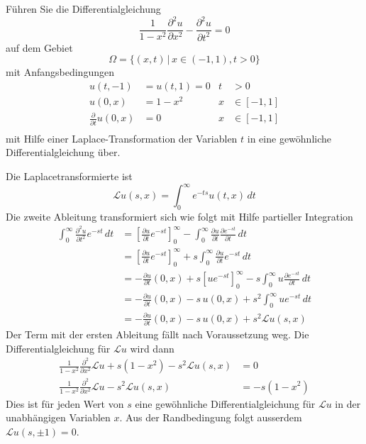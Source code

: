 Führen Sie die Differentialgleichung
\[
\frac1{1-x^2}\frac{\partial^2 u}{\partial x^2}
-
\frac{\partial^2 u}{\partial t^2}=0
\]
auf dem Gebiet
\[
\Omega=\{(x,t)\,|\, x\in (-1,1), t>0\}
\]
mit Anfangsbedingungen
\begin{align*}
u(t,-1)&=u(t,1)=0&t&>0\\
u(0,x)&=1-x^2&x&\in[-1,1]\\
\frac{\partial}{\partial t}u(0,x)&=0&x&\in[-1,1]\\
\end{align*}
mit Hilfe einer Laplace-Transformation der Variablen $t$ in eine
gewöhnliche Differentialgleichung über.

\begin{loesung}
Die Laplacetransformierte ist
\[
\mathscr{L}u(s,x)=\int_0^{\infty}e^{-ts}u(t,x)\,dt
\]
Die zweite Ableitung transformiert sich wie folgt mit Hilfe
partieller Integration
\begin{align*}
\int_0^\infty \frac{\partial^2u}{\partial t^2}e^{-st}\,dt
&=
\left[
\frac{\partial u}{\partial t}e^{-st}
\right]_0^\infty
-\int_0^\infty
\frac{\partial u}{\partial t}\frac{\partial e^{-st}}{\partial t}
\,dt
\\
&=
\left[
\frac{\partial u}{\partial t}e^{-st}
\right]_0^\infty
+s\int_0^\infty
\frac{\partial u}{\partial t}e^{-st}
\,dt
\\
&=
-\frac{\partial u}{\partial t}(0,x)
+s\left[
ue^{-st}
\right]_0^\infty
-s\int_0^\infty u\frac{\partial e^{-st}}{\partial t}\,dt
\\
&=
-\frac{\partial u}{\partial t}(0,x)
-s\,
u(0,x)
+s^2\int_0^\infty u e^{-st}\,dt
\\
&=
-\frac{\partial u}{\partial t}(0,x)
-s\,u(0,x)+s^2\mathscr{L}u(s,x)
\end{align*}
Der Term mit der ersten Ableitung fällt nach Voraussetzung weg.
Die Differentialgleichung für $\mathscr{L}u$ wird dann
\begin{align*}
\frac1{1-x^2}\frac{\partial^2}{\partial x^2}\mathscr{L}u
+s(1-x^2)-s^2\mathscr{L}u(s,x)
&=0
\\
\frac1{1-x^2}\frac{\partial^2}{\partial x^2}\mathscr{L}u
-s^2\mathscr{L}u(s,x)
&=-s(1-x^2)
\end{align*}
Dies ist für jeden Wert von $s$ eine gewöhnliche Differentialgleichung
für $\mathscr{L}u$ in der unabhängigen Variablen $x$.
Aus der Randbedingung folgt ausserdem $\mathscr{L}u(s,\pm 1)=0$.
\end{loesung}
